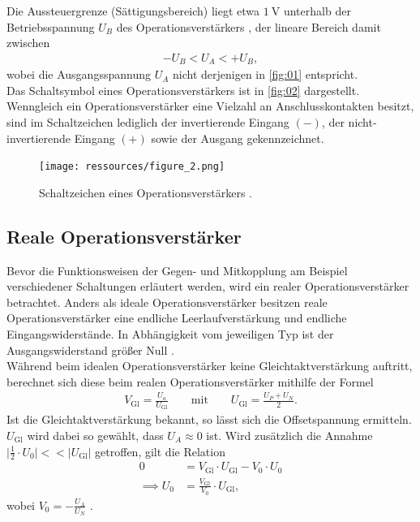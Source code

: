 \noindent Die Aussteuergrenze (Sättigungsbereich) liegt etwa $\SI{1}{\volt}$
unterhalb der Betriebsspannung $U_B$ des Operationsverstärkers \cite{federau}, der
lineare Bereich damit zwischen
\begin{align}
  - U_B < U_A < + U_B,
  \label{eqn:02}
\end{align}
\noindent wobei die Ausgangsspannung $U_A$ nicht derjenigen in \autoref{fig:01}
entspricht. \\
\newline
\noindent Das Schaltsymbol eines Operationsverstärkers ist in \autoref{fig:02}
dargestellt. Wenngleich ein Operationsverstärker eine Vielzahl an
Anschlusskontakten besitzt, sind im Schaltzeichen lediglich der
invertierende Eingang $(-)$, der nicht-invertierende Eingang $(+)$ sowie der
Ausgang gekennzeichnet.
\begin{figure}
  \centering
  \texttt{[image: ressources/figure\_2.png]}
  \caption{Schaltzeichen eines Operationsverstärkers \cite{federau}.}
  \label{fig:02}
\end{figure}
\subsection{Reale Operationsverstärker}
\noindent Bevor die Funktionsweisen der Gegen- und Mitkopplung am Beispiel
verschiedener Schaltungen erläutert werden, wird ein realer Operationsverstärker
betrachtet. Anders als ideale Operationsverstärker besitzen reale
Operationsverstärker eine endliche Leerlaufverstärkung und endliche
Eingangswiderstände. In Abhängigkeit vom jeweiligen Typ ist der Ausgangswiderstand
größer Null \cite{federau}.\\
\noindent Während beim idealen Operationsverstärker keine Gleichtaktverstärkung
auftritt, berechnet sich diese beim realen Operationsverstärker mithilfe der
Formel
\begin{align}
  V_\text{Gl} = \frac{U_a}{U_\text{Gl}} \qquad \text{mit} \qquad U_\text{Gl} = \frac{U_P + U_N}{2}.
  \label{eqn:03}
\end{align}
\noindent Ist die Gleichtaktverstärkung bekannt, so lässt sich die Offsetspannung
ermitteln. $U_\text{Gl}$ wird dabei so gewählt, dass $U_A \approx 0$ ist. Wird
zusätzlich die Annahme $\bigr| \frac{1}{2} \cdot U_0 \bigr| << \bigr| U_\text{Gl} \bigr|$
getroffen, gilt die Relation
\begin{align}
  0 &= V_\text{Gl} \cdot U_\text{Gl} - V_0 \cdot U_0 \\
  \implies U_0 &= \frac{V_\text{Gl}}{V_0} \cdot U_\text{Gl},
  \label{eqn:04}
\end{align}
\noindent wobei $V_0 = - \frac{U_A}{U_N}$ \cite{muenster}.
